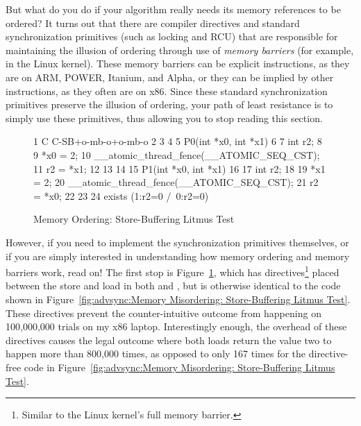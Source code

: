 But what do you do if your algorithm really needs its memory
references to be ordered?
It turns out that there are compiler directives and standard
synchronization primitives (such as locking and RCU)
that are responsible for maintaining the illusion of ordering through use of
\emph{memory barriers} (for example,  in the Linux kernel).
These memory barriers can be explicit instructions, as they are on
ARM, POWER, Itanium, and Alpha, or they can be implied by other instructions,
as they often are on x86.
Since these standard synchronization primitives preserve the illusion of
ordering, your path of least resistance is to simply use these primitives,
thus allowing you to stop reading this section.
\fi

\begin{figure}
{ \scriptsize
\begin{verbbox}
 1 C C-SB+o-mb-o+o-mb-o
 2 {
 3 }
 4
 5 P0(int *x0, int *x1)
 6 {
 7   int r2;
 8
 9   *x0 = 2;
10   __atomic_thread_fence(__ATOMIC_SEQ_CST);
11   r2 = *x1;
12 }
13
14
15 P1(int *x0, int *x1)
16 {
17   int r2;
18
19   *x1 = 2;
20   __atomic_thread_fence(__ATOMIC_SEQ_CST);
21   r2 = *x0;
22 }
23
24 exists (1:r2=0 /\ 0:r2=0)
\end{verbbox}
}
\centering
\theverbbox
\caption{Memory Ordering: Store-Buffering Litmus Test}
\label{fig:advsync:Memory Ordering: Store-Buffering Litmus Test}
\end{figure}

However, if you need to implement the synchronization primitives
themselves, or if you are simply interested in understanding how memory
ordering and memory barriers work, read on!
The first stop is
Figure~\ref{fig:advsync:Memory Ordering: Store-Buffering Litmus Test},
which has  directives\footnote{
	Similar to the Linux kernel's  full memory barrier.}
placed between
the store and load in both  and , but is otherwise
identical to the code shown in
Figure~\ref{fig:advsync:Memory Misordering: Store-Buffering Litmus Test}.
These directives prevent the counter-intuitive outcome from happening
on 100,000,000 trials on my x86 laptop.
Interestingly enough, the overhead of these directives causes the
legal outcome where both loads return the value two to happen more
than 800,000 times, as opposed to only 167 times for the
directive-free code in
Figure~\ref{fig:advsync:Memory Misordering: Store-Buffering Litmus Test}.

